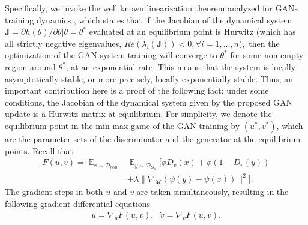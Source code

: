 \documentclass[10pt,twocolumn,letterpaper]{article}
\newcommand{\nn}{\nonumber}
\newcommand{\g}{{G_u}}
\newcommand{\di}{{D_v}}
\newcommand{\D}{\mathcal{D}}
\newcommand{\E}{\mathbb{E}}
\newcommand{\M}{\mathcal{M}}
\newtheorem{as}{Assumption}
\begin{document}
Specifically, we invoke the well known linearization theorem \cite{khalil1996noninear} analyzed for GANs training dynamics \cite{nagarajan2017gradient}, which states that if the Jacobian of the dynamical
system $\mathbf{J} = \partial h(\theta)/\partial \theta|\theta=\theta^\ast$ evaluated at an equilibrium point is Hurwitz (which has all strictly negative
eigenvalues, $Re(\lambda_i(\mathbf J)) < 0, \forall i = 1, \ldots , n),$ then the optimization of the GAN system training will converge to $\theta^\ast$	for some non-empty region around $\theta^\ast$, at an exponential rate. This means that the system is locally asymptotically stable, or more precisely, locally exponentially stable.
Thus, an important contribution here is a proof of the following fact: under some
conditions, the Jacobian of the dynamical system given by the proposed GAN update is a Hurwitz matrix at equilibrium. For simplicity, we denote the equilibrium point in the min-max game of the GAN training by $(u^\ast, v^\ast)$, which are the parameter sets of the discriminator and the generator at the equilibrium points. Recall that
\begin{align}
F(u,v)= \mathop{\E}_{x\sim \D_{real}}&\mathop{\E}_{y\sim \D_{\g}}[\phi \di(x)+ \phi(1-\di(y))\nn\\&+\lambda \|\nabla_\M (\psi(y)-\psi(x))\|^2].
\end{align}
The gradient steps in both $u$ and $v$ are taken simultaneously, resulting in the following gradient differential equations
\begin{align}\label{updates}
\dot{u} = \nabla_u F(u,v), \ \ \ \dot{v} = \nabla_v F(u,v).
\end{align}
\end{document}
